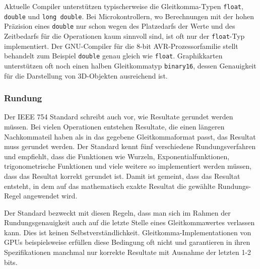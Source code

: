 Aktuelle Compiler unterstützen typischerweise die Gleitkomma-Typen
\texttt{float}, \texttt{double} und \texttt{long double}.
%
%
%
%
Bei Microkontrollern, wo Berechnungen mit der hohen Präzision
eines \texttt{double} nur schon wegen des Platzedarfs der Werte
und des Zeitbedarfs für die Operationen kaum sinnvoll sind, ist oft
nur der \texttt{float}-Typ implementiert.
%
Der GNU-Compiler für die 8-bit AVR-Prozessorfamilie stellt behandelt
zum Beispiel \texttt{double} genau gleich wie \texttt{float}.
%
%
Graphikkarten unterstützen oft noch einen halben Gleitkommatyp
\texttt{binary16}, dessen Genauigkeit für die Darstellung von 3D-Objekten
ausreichend ist.
%
%
%

\subsubsection{Rundung}
Der IEEE 754 Standard schreibt auch vor, wie Resultate gerundet werden
müssen.
Bei vielen Operationen entstehen Resultate, die einen längeren 
Nachkommateil haben als in das gegebene Gleitkommaformat passt,
das Resultat muss gerundet werden.
%
Der Standard kennt fünf verschiedene Rundungsverfahren und empfiehlt,
dass die Funktionen wie Wurzeln, Exponentialfunktionen,
trigonometrische Funktionen und viele weitere so implementiert werden 
müssen, dass das Resultat korrekt gerundet ist.
%
%
%
%
Damit ist gemeint, dass das Resultat entsteht, in dem auf das
mathematisch exakte Resultat die gewählte Rundungs-Regel angewendet
wird.

Der Standard bezweckt mit diesen Regeln, dass man sich im Rahmen der
Rundungsgenauigkeit auch auf die letzte Stelle eines Gleitkommawertes
verlassen kann.
Dies ist keinen Selbstverständlichkeit.
Gleitkomma-Implementationen von GPUs beispielsweise erfüllen diese
%
Bedingung oft nicht und garantieren in ihren Spezifikationen manchmal
nur korrekte Resultate mit Ausnahme der letzten 1-2 bits.

